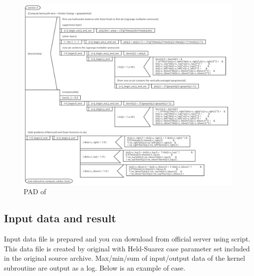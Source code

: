 \begin{figure}[tbp]
\centering
\includegraphics[scale=.5]{figs/caldyn_horiz_sec3.pdf}
 \caption{PAD of }\label{f:pad_comp_caldyn_horiz_3}
\end{figure}

\clearpage


\subsection{Input data and result}

Input data file is prepared and you can download from official server using
 script.
%
This data file is created by original \DYNAMICO\footnotemark with
Held-Suarez case parameter set included in the original source archive.
%
%
Max/min/sum of input/output data of the kernel subroutine are output as
a log.
%
Below is an example of  case.

